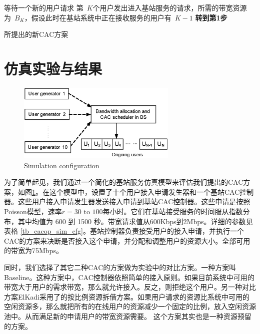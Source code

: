 \begin{algorithm}[bt]
等待一个新的用户请求\;
第~$K$个用户发出进入基站服务的请求，所需的带宽资源为~$B_K$，假设此时在基站系统中正在接收服务的用户有~$K-1$\;
{\bf{转到第1步}}\;
\caption{所提出的新CAC方案}
\label{agr_cac}
\end{algorithm}

\section{仿真实验与结果}
\label{cacop_sim}
%
\begin{figure}[tb]
\centering
\includegraphics[width=3in] {simulator.eps}
\caption{Simulation configuration} \label{pic_cacop_sim_cfg}
\end{figure}

为了简单起见，我们通过一个简化的基站服务仿真模型来评估我们提出的CAC方案，如图\ref{pic_cacop_sim_cfg}。在这个模型中，设置了十个用户接入申请发生器和一个基站CAC控制器。这些用户接入申请发生器发送接入申请到基站CAC控制器。这些申请是按照Poisson模型，速率$r=30 \text{ to } 100 $每小时。它们在基站接受服务的时间服从指数分布，其中均值为 600 到 1500 秒。带宽请求值从600Kbps到2Mbps。详细的参数见表格 \ref{tb_cacop_sim_cfg}。基站控制器负责接受用户的接入申请，并执行一个CAC的方案来决断是否接入这个申请，并分配和调整用户的资源大小。全部可用的带宽为75Mbps。

同时，我们选择了其它二种CAC的方案做为实验中的对比方案。一种方案叫Baseline。这种方案中，CAC控制器依照简单的接入原则。如果目前系统中可用的带宽大于用户的需求带宽，那么就允许接入。反之，则拒绝这个用户。另一种对比方案ElKadi采用了的按比例资源拆借方案。如果用户请求的资源比系统中可用的空闲资源多，那么就把所有的在线用户的资源减少一个固定的比例，放入空闲资源池中。从而满足新的申请用户的带宽资源需要。\cite{EL-Kadi2002} 这个方案其实也是一种资源预留的方案。

